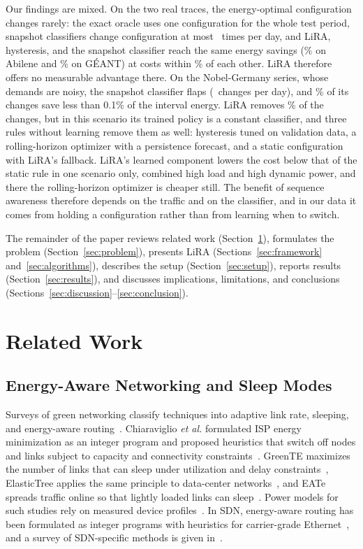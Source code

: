 \documentclass[journal]{IEEEtran}
\begin{document}
Our findings are mixed. On the two real traces, the energy-optimal configuration changes rarely: the exact oracle uses one configuration for the whole test period, snapshot classifiers change configuration at most \abiBFourchg\ times per day, and LiRA, hysteresis, and the snapshot classifier reach the same energy savings (\abiSav\% on Abilene and \geaSav\% on G\'{E}ANT) at costs within \realSpread\% of each other. LiRA therefore offers no measurable advantage there. On the Nobel-Germany series, whose demands are noisy, the snapshot classifier flaps (\nobBFourchg\ changes per day), and \gainTenthShare\% of its changes save less than 0.1\% of the interval energy. LiRA removes \nobY\% of the changes, but in this scenario its trained policy is a constant classifier, and three rules without learning remove them as well: hysteresis tuned on validation data, a rolling-horizon optimizer with a persistence forecast, and a static configuration with LiRA's fallback. LiRA's learned component lowers the cost below that of the static rule in one scenario only, combined high load and high dynamic power, and there the rolling-horizon optimizer is cheaper still. The benefit of sequence awareness therefore depends on the traffic and on the classifier, and in our data it comes from holding a configuration rather than from learning when to switch.

The remainder of the paper reviews related work (Section~\ref{sec:related}), formulates the problem (Section~\ref{sec:problem}), presents LiRA (Sections~\ref{sec:framework} and~\ref{sec:algorithms}), describes the setup (Section~\ref{sec:setup}), reports results (Section~\ref{sec:results}), and discusses implications, limitations, and conclusions (Sections~\ref{sec:discussion}--\ref{sec:conclusion}).

\section{Related Work}\label{sec:related}

\subsection{Energy-Aware Networking and Sleep Modes}

Surveys of green networking classify techniques into adaptive link rate, sleeping, and energy-aware routing~\cite{bianzino2012survey,bolla2011energy}. Chiaraviglio \emph{et al.} formulated ISP energy minimization as an integer program and proposed heuristics that switch off nodes and links subject to capacity and connectivity constraints~\cite{chiaraviglio2012minimizing}. GreenTE maximizes the number of links that can sleep under utilization and delay constraints~\cite{zhang2010greente}, ElasticTree applies the same principle to data-center networks~\cite{heller2010elastictree}, and EATe spreads traffic online so that lightly loaded links can sleep~\cite{vasic2010eate}. Power models for such studies rely on measured device profiles~\cite{mahadevan2009power,restrepo2009energy,vishwanath2014modeling}. In SDN, energy-aware routing has been formulated as integer programs with heuristics for carrier-grade Ethernet~\cite{maaloul2018carrier}, and a survey of SDN-specific methods is given in~\cite{assefa2019survey}.
\end{document}
